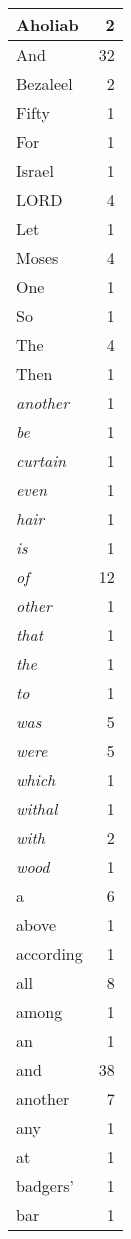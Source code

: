 \begin{center}
\begin{longtable}{l|r}
\hline \hline
\endlastfoot
Aholiab & 2 \\ \hline
And & 32 \\ \hline
Bezaleel & 2 \\ \hline
Fifty & 1 \\ \hline
For & 1 \\ \hline
Israel & 1 \\ \hline
LORD & 4 \\ \hline
Let & 1 \\ \hline
Moses & 4 \\ \hline
One & 1 \\ \hline
So & 1 \\ \hline
The & 4 \\ \hline
Then & 1 \\ \hline
\emph{another} & 1 \\ \hline
\emph{be} & 1 \\ \hline
\emph{curtain} & 1 \\ \hline
\emph{even} & 1 \\ \hline
\emph{hair} & 1 \\ \hline
\emph{is} & 1 \\ \hline
\emph{of} & 12 \\ \hline
\emph{other} & 1 \\ \hline
\emph{that} & 1 \\ \hline
\emph{the} & 1 \\ \hline
\emph{to} & 1 \\ \hline
\emph{was} & 5 \\ \hline
\emph{were} & 5 \\ \hline
\emph{which} & 1 \\ \hline
\emph{withal} & 1 \\ \hline
\emph{with} & 2 \\ \hline
\emph{wood} & 1 \\ \hline
a & 6 \\ \hline
above & 1 \\ \hline
according & 1 \\ \hline
all & 8 \\ \hline
among & 1 \\ \hline
an & 1 \\ \hline
and & 38 \\ \hline
another & 7 \\ \hline
any & 1 \\ \hline
at & 1 \\ \hline
badgers' & 1 \\ \hline
bar & 1 \\ \hline

\end{longtable}
\end{center}
